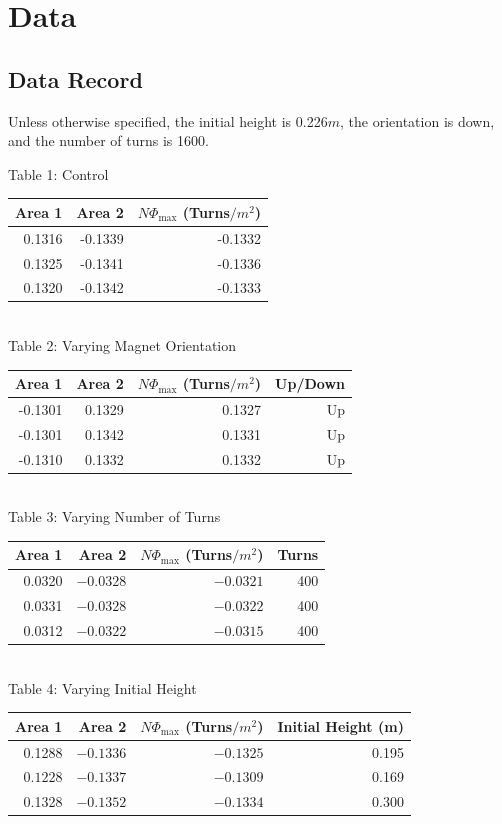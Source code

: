 \documentclass[11pt, letterpaper]{report}
\begin{document}
\section{Data}
\subsection{Data Record}
Unless otherwise specified, the initial height is 0.226$m$, the orientation is down, and the number of turns is 1600.
\begin{center}
	Table 1: Control\label{tab:1}\vspace{5pt}\\
	\begin{tabular}{rrr}
	\toprule
	Area 1&Area 2&$N\Phi_{\max }$ (Turns$/m^2$)\\
	\midrule
	0.1316&-0.1339&-0.1332\\
	0.1325&-0.1341&-0.1336\\
	0.1320&-0.1342&-0.1333\\
	\bottomrule
\end{tabular}\vspace{20pt}\\
Table 2: Varying Magnet Orientation\label{tab:2}\vspace{5pt}\\
\begin{tabular}{rrrr}
	\toprule
	Area 1&Area 2&$N\Phi_{\max }$ (Turns$/m^2$)&Up/Down\\
	\midrule
	-0.1301&0.1329&0.1327&Up\\
	-0.1301&0.1342&0.1331&Up\\
	-0.1310&0.1332&0.1332&Up\\
	\bottomrule
\end{tabular}\vspace{20pt}\\
Table 3: Varying Number of Turns\label{tab:3}\vspace{5pt}\\
\begin{tabular}{rrrr}
	\toprule
	Area 1&Area 2&$N\Phi_{\max }$ (Turns$/m^2$)&Turns\\
	\midrule
	0.0320&$-0.0328$&$-0.0321$&400\\
	0.0331&$-0.0328$ &$-0.0322$ &400\\
	0.0312&$-0.0322$ &$-0.0315$ &400\\
	\bottomrule
\end{tabular}\vspace{20pt}\\
Table 4: Varying Initial Height\label{tab:4}\vspace{5pt}\\
\begin{tabular}{rrrr}
	\toprule
	Area 1&Area 2&$N\Phi_{\max }$ (Turns$/m^2$)&Initial Height (m)\\
	\midrule
	0.1288&$-0.1336$ &$-0.1325$ &0.195\\
	$0.1228$ &$-0.1337$ &$-0.1309$ &0.169\\
	0.1328&$-0.1352$ &$-0.1334$ &0.300\\
	\bottomrule
\end{tabular}
\end{center}
\end{document}
